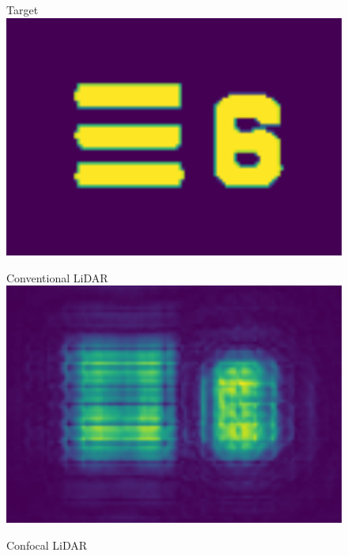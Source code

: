 \documentclass{article}
\begin{document}
\begin{figure}[hbt!]
\centering
\begin{minipage}{.225\linewidth}
\centering
\captionsetup{type=figure}
Target \
\includegraphics[width=\linewidth]{001 Object.png}
\label{subfig:original}
\end{minipage}\hfill
\begin{minipage}{.225\linewidth}
\centering
\captionsetup{type=figure}
Conventional LiDAR \
\includegraphics[width=\linewidth]{002 wide field imaging.png}
\label{subfig:conventional}
\end{minipage}\hfill
\begin{minipage}{.225\linewidth}
\centering
\captionsetup{type=figure}
Confocal LiDAR \

\end{minipage}
\end{figure}
\end{document}
